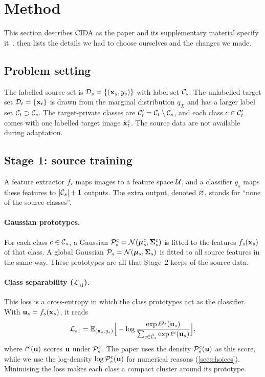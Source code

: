\section{Method}\label{sec:method}

This section describes CIDA as the paper and its supplementary material specify it~\citep{kundu2020cida}.
 then lists the details we had to choose ourselves and the changes we made.



\subsection{Problem setting}\label{sec:setting}
The labelled source set is $\mathcal{D}_s=\{(\mathbf{x}_s,y_s)\}$ with label set $\mathcal{C}_s$.
The unlabelled target set $\mathcal{D}_t=\{\mathbf{x}_t\}$ is drawn from the marginal distribution $q_X$ and has a larger label set $\mathcal{C}_t\supset\mathcal{C}_s$.
The target-private classes are $\mathcal{C}'_t=\mathcal{C}_t\setminus\mathcal{C}_s$, and each class $c\in\mathcal{C}'_t$ comes with one labelled target image $\tilde{\mathbf{x}}_t^c$.
The source data are not available during adaptation.

\subsection{Stage 1: source training}\label{sec:stage1}
A feature extractor $f_s$ maps images to a feature space $\mathcal{U}$, and a classifier $g_s$ maps these features to $|\mathcal{C}_s|+1$ outputs.
The extra output, denoted $\varnothing$, stands for ``none of the source classes''.

\paragraph{Gaussian prototypes.}
For each class $c\in\mathcal{C}_s$, a Gaussian $\mathcal{P}_s^c=\mathcal{N}(\bm{\mu}_s^c,\bm{\Sigma}_s^c)$ is fitted to the features $f_s(\mathbf{x}_s)$ of that class.
A global Gaussian $\mathcal{P}_s=\mathcal{N}(\bm{\mu}_s,\bm{\Sigma}_s)$ is fitted to all source features in the same way.
These prototypes are all that Stage~2 keeps of the source data.

\paragraph{Class separability ($\mathcal{L}_{s1}$).}
This loss is a cross-entropy in which the class prototypes act as the classifier.
With $\mathbf{u}_s=f_s(\mathbf{x}_s)$, it reads
\begin{equation}
  \mathcal{L}_{s1} = \mathbb{E}_{(\mathbf{x}_s,y_s)}\Big[-\log\frac{\exp \ell^{y_s}(\mathbf{u}_s)}{\sum_{c\in\mathcal{C}_s}\exp \ell^{c}(\mathbf{u}_s)}\Big],
  \label{eq:ls1}
\end{equation}
where $\ell^c(\mathbf{u})$ scores $\mathbf{u}$ under $\mathcal{P}_s^c$.
The paper uses the density $\mathcal{P}_s^c(\mathbf{u})$ as this score, while we use the log-density $\log\mathcal{P}_s^c(\mathbf{u})$ for numerical reasons (\cref{sec:choices}).
Minimising the loss makes each class a compact cluster around its prototype.

